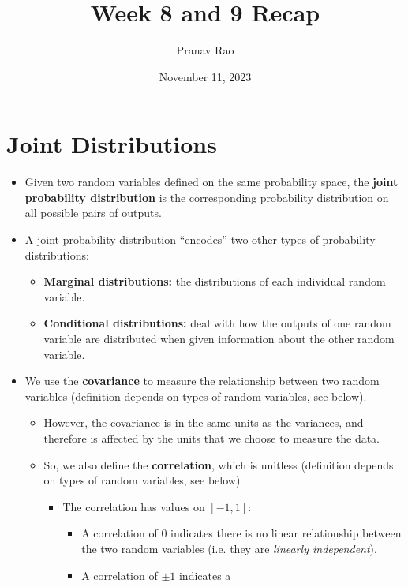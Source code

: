 \documentclass[12pt]{article}
\title{Week 8 and 9 Recap}
\author{Pranav Rao}
\date{November 11, 2023}
\begin{document}
\maketitle

\section{Joint Distributions}
\begin{itemize}
	\item Given two random variables defined on the same
	      probability space, the \textbf{joint probability distribution} is the
	      corresponding probability distribution on all possible pairs of
	      outputs.
	\item A joint probability distribution ``encodes'' two other types of probability distributions:
	      \begin{itemize}
		      \item \textbf{Marginal distributions:} the distributions of each individual random variable.
		      \item \textbf{Conditional distributions:} deal with how the
		            outputs of one random variable are distributed when
		            given information about the other random variable.
	      \end{itemize}
	\item We use the \textbf{covariance} to measure the relationship between two random variables (definition depends on types of random variables, see below).
	      \begin{itemize}
		      \item However, the covariance is in the same units as the
		            variances, and therefore is affected by the units that we
		            choose to measure the data.
		      \item So, we also define the \textbf{correlation}, which is unitless (definition depends on types of random variables, see below)
		            \begin{itemize}
			            \item The correlation has values on $[-1, 1]$:
			                  \begin{itemize}
				                  \item A correlation of $0$ indicates there is
				                        no linear relationship between the two
				                        random variables (i.e. they are
				                        \emph{linearly independent}).
				                  \item A correlation of $\pm 1$ indicates a

\end{itemize}
\end{itemize}
\end{itemize}
\end{itemize}
\end{document}

